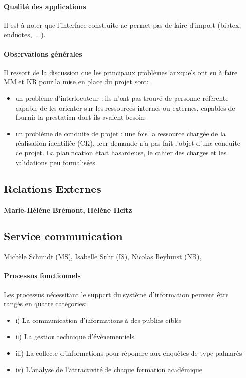 \documentclass{book}
\begin{document}
\paragraph{Qualité des applications}
Il est à noter que l'interface construite ne permet pas de faire d'import (bibtex, 
endnotes,~...). 


\paragraph{Observations générales}
Il ressort de la discussion que les principaux problèmes auxquels ont eu à 
faire MM et KB pour la mise en place du projet sont:
\begin{itemize}
\item un problème d'interlocuteur : ils n'ont pas trouvé de personne référente 
capable de les orienter sur les ressources internes ou externes, capables de fournir 
la prestation dont ils avaient besoin.
\item un problème de conduite de projet : une fois la ressource chargée de la 
réalisation identifiée (CK), leur demande n'a pas fait l'objet d'une conduite
de projet. La planification était hasardeuse, le cahier des charges et
les validations peu formalisées.
\end{itemize}




\subsection{Relations Externes}
\paragraph{Marie-Hélène Brémont, Hélène Heitz}

\subsection{Service communication}
Michèle Schmidt (MS), Isabelle Suhr (IS), Nicolas Beyhurst (NB),

\paragraph{Processus fonctionnels}
Les processus nécessitant le support du système d'information peuvent 
être rangés en quatre catégories:
\begin{itemize}
\item i) La communication d'informations à des publics ciblés
\item ii) La gestion technique d'évènementiels 
\item iii) La collecte d'informations pour répondre aux enquêtes de type palmarès
\item iv) L'analyse de l'attractivité de chaque formation académique
\end{itemize}
\bigskip
\end{document}
